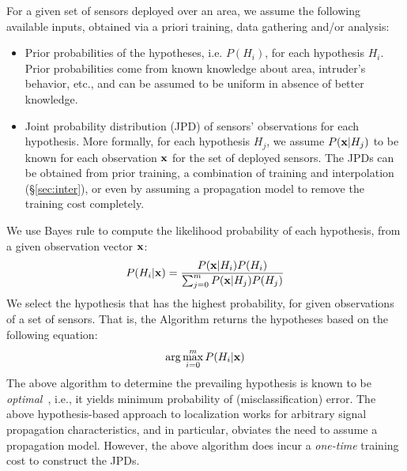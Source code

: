  For a given set of sensors deployed over an area, we
assume the following available inputs, obtained via a priori training,
data gathering and/or analysis:
\begin{itemize}
\item
Prior probabilities of the hypotheses, i.e. $P(H_i)$, for each
hypothesis $H_i$. Prior probabilities come from known knowledge about
area, intruder's behavior, etc., and can be assumed to be uniform in
absence of better knowledge.

\item
Joint probability distribution (JPD) of sensors' observations for each
hypothesis. More formally, for each hypothesis $H_j$, we assume
$P(\mathbf{x}|H_j)$ to be known for each observation $\mathbf{x}$ for the set of
deployed sensors.  The JPDs can be obtained from prior training, a
combination of training and interpolation (\S\ref{sec:inter}), or
even by assuming a propagation model to remove the training
cost completely.
\end{itemize}

  We use
Bayes rule to compute the likelihood probability of each hypothesis,
from a given observation vector $\mathbf{x}$:
\begin{equation}
  P(H_i | \mathbf{x}) = \frac{P(\mathbf{x}| H_i)P(H_i)}{\sum_{j=0}^m P(\mathbf{x}|H_j)P(H_j)}
  \label{eqn:bayes}
\end{equation}
We select the hypothesis that has the highest probability, for given
observations of a set of sensors. That is, the \mll Algorithm returns
the hypotheses based on the following equation:
\begin{equation}
  \arg \max_{i=0}^m P(H_i | \mathbf{x})
  \label{eqn:map}
\end{equation}
The above \mll algorithm to determine the prevailing hypothesis is
known to be {\em optimal}~\cite{map-optimal}, i.e., it yields minimum
probability of (misclassification) error. The above hypothesis-based
approach to localization works for arbitrary signal propagation
characteristics, and in particular, obviates the need to assume a
propagation model. However, the above \mll algorithm does incur a {\em
  one-time} training cost to construct the JPDs.



